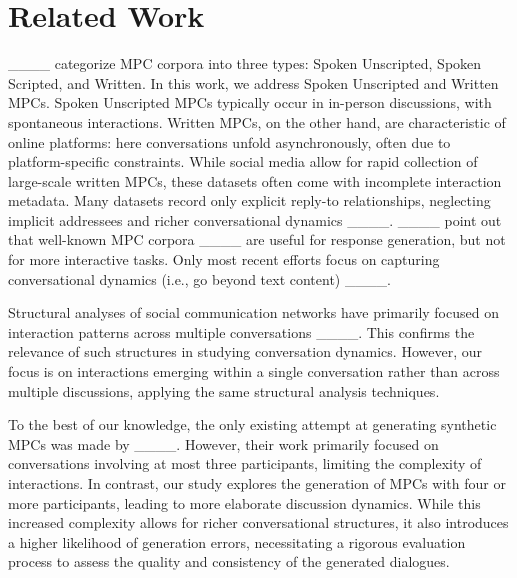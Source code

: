 \section{Related Work}
____ categorize MPC corpora into three types: Spoken Unscripted, Spoken Scripted, and Written. In this work, we address Spoken Unscripted and Written MPCs. Spoken Unscripted MPCs typically occur in in-person discussions, with spontaneous interactions. Written MPCs, on the other hand, are characteristic of online platforms: here conversations unfold asynchronously, often due to platform-specific constraints. While social media allow for rapid collection of large-scale written MPCs, these datasets often come with incomplete interaction metadata. Many datasets record only explicit reply-to relationships, neglecting implicit addressees and richer conversational dynamics ____. ____ point out that well-known MPC corpora ____ are useful for response generation, but not for more interactive tasks. Only most recent efforts focus on capturing conversational dynamics (i.e., go beyond text content) ____.

Structural analyses of social communication networks have primarily focused on interaction patterns across multiple conversations ____. This confirms the relevance of such structures in studying conversation dynamics. However, our focus is on interactions emerging within a single conversation rather than across multiple discussions, applying the same structural analysis techniques. 

To the best of our knowledge, the only existing attempt at generating synthetic MPCs was made by ____. However, their work primarily focused on conversations involving at most three participants, limiting the complexity of interactions. In contrast, our study explores the generation of MPCs with four or more participants, leading to more elaborate discussion dynamics. While this increased complexity allows for richer conversational structures, it also introduces a higher likelihood of generation errors, necessitating a rigorous evaluation process to assess the quality and consistency of the generated dialogues.